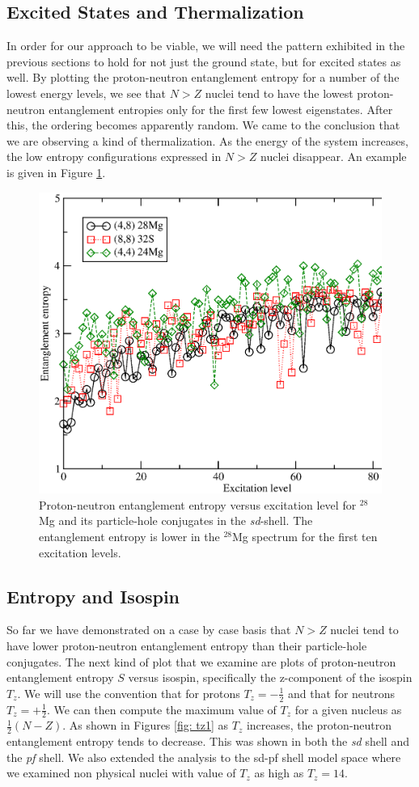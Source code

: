 \subsection{Excited States and Thermalization}
In order for our approach to be viable, we will need the pattern exhibited in 
the previous sections to hold for not just the ground state, but for excited 
states as well. By plotting the proton-neutron entanglement entropy for
a number of the lowest energy levels, we see that $N>Z$ nuclei tend to have
the lowest proton-neutron entanglement entropies only for the first few 
lowest eigenstates. After this, the ordering becomes apparently random.
We came to the conclusion that we are observing a kind of thermalization. 
As the energy of the system increases,
the low entropy configurations expressed in $N>Z$ nuclei disappear. An example
is given in Figure \ref{smglvl}.

\begin{figure}[t]
    \centering
    \includegraphics[width=.75\textwidth,clip]{Figures/S_vs_level_mg}
    \caption{Proton-neutron entanglement entropy versus excitation level for $^{28}$Mg and 
its particle-hole conjugates in the \textit{sd}-shell. 
The entanglement entropy is lower in the $^{28}$Mg spectrum for the first ten 
excitation levels.}
    \label{smglvl}
\end{figure}

\subsection{Entropy and Isospin}
So far we have demonstrated on a case by case basis that $N>Z$ nuclei tend to have
lower proton-neutron entanglement entropy than their particle-hole conjugates. 
The next kind of plot that we examine are plots of proton-neutron entanglement 
entropy $S$ versus isospin, specifically the z-component of the isospin $T_z$. 
We will use the convention that for protons $T_z=-\frac{1}{2}$ and that for
neutrons $T_z=+\frac{1}{2}$. We can then compute the maximum value of $T_z$ for 
a given nucleus as $\frac{1}{2}(N-Z)$. As shown in Figures \ref{fig: tz1} as 
$T_z$ increases, the proton-neutron entanglement entropy tends to decrease. This
was shown in both the \textit{sd} shell and the \textit{pf} shell. We also extended the analysis 
to the sd-pf shell model space where we examined non physical nuclei with 
value of $T_z$ as high as $T_z=14$.

